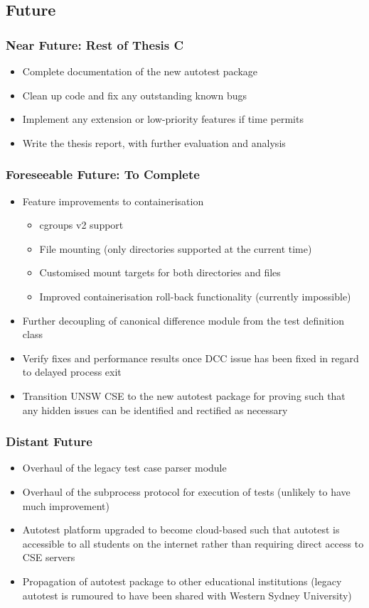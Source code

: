 \documentclass[xcolor, handout]{beamer}
\begin{document}
\subsection{Future}
\begin{frame}
	\frametitle{Near Future: Rest of Thesis C}
	\begin{itemize}
		\setlength\itemsep{1em}
		\item Complete documentation of the new autotest package
			\pause
		\item Clean up code and fix any outstanding known bugs
			\pause
		\item Implement any extension or low-priority features if time permits
			\pause
		\item Write the thesis report, with further evaluation and analysis
	\end{itemize}
\end{frame}
\begin{frame}
	\frametitle{Foreseeable Future: To Complete}
	\begin{itemize}
		\setlength\itemsep{1em}
		\item Feature improvements to containerisation
		\begin{itemize}
			\item cgroups v2 support
				\pause
			\item File mounting (only directories supported at the current time)
				\pause
			\item Customised mount targets for both directories and files
				\pause
			\item Improved containerisation roll-back functionality (currently impossible)
				\pause 
		\end{itemize}
		\item Further decoupling of canonical difference module from the test definition class 
			\pause
		\item Verify fixes and performance results once DCC issue has been fixed in regard to delayed process exit
			\pause
		\item Transition UNSW CSE to the new autotest package for proving such that any hidden issues can be identified and rectified as necessary
	\end{itemize}
\end{frame}
\begin{frame}
	\frametitle{Distant Future}
	\begin{itemize}
		\setlength\itemsep{1em}
		\item Overhaul of the legacy test case parser module
			\pause
		\item Overhaul of the subprocess protocol for execution of tests (unlikely to have much improvement) 
			\pause
		\item Autotest platform upgraded to become cloud-based such that autotest is accessible to all students on the internet rather than requiring direct access to CSE servers
			\pause
		\item Propagation of autotest package to other educational institutions (legacy autotest is rumoured to have been shared with Western Sydney University)
	\end{itemize}
\end{frame}
\end{document}
